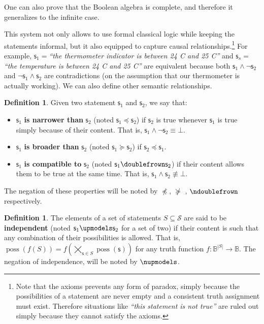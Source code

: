 \documentclass[letterpaper]{article}
\theoremstyle{plain}%
\theoremstyle{definition}
\newtheorem{defn}[thrm]{Definition}
\theoremstyle{remark}
\DeclareMathOperator{\possFn}{poss}
\def\contradiction{\bot}
\def\comp{\doublefrown}
\def\ncomp{\ndoublefrown}
\def\narrower{\preccurlyeq}
\def\nnarrower{\npreccurlyeq}
\def\broader{\succcurlyeq}
\def\nbroader{\nsucccurlyeq}
\def\indep{\upmodels}
\def\nindep{\nupmodels}
\def\AND{\wedge}
\def\NOT{\neg}
\newcommand{\stmt}[1][s] {\mathsf{#1}}
\newcommand{\statement}[1] {\emph{``#1''}}
\begin{document}
One can also prove that the Boolean algebra is complete, and therefore it generalizes to the infinite case.

This system not only allows to use formal classical logic while keeping the statements informal, but it also equipped to capture causal relationships.\footnote{Note that the axioms prevents any form of paradox, simply because the possibilities of a statement are never empty and a consistent truth assignment must exist. Therefore situations like \statement{this statement is not true} are ruled out simply because they cannot satisfy the axioms.} For example, $\stmt_1=$\statement{the thermometer indicator is between 24 C and 25 C} and $\stmt_s=$\statement{the temperature is between 24 C and 25 C} are equivalent because both $\stmt_1 \AND \NOT \stmt_2$ and $\NOT \stmt_1 \AND \stmt_2$ are contradictions (on the assumption that our thermometer is actually working). We can also define other semantic relationships.

\begin{defn}
	Given two statement $\stmt_1$ and $\stmt_2$, we say that:
	\begin{itemize}
		\item $\stmt_1$ \textbf{is narrower than} $\stmt_2$ (noted $\stmt_1 \narrower \stmt_2$) if $\stmt_2$ is true whenever $\stmt_1$ is true simply because of their content. That is, $\stmt_1 \AND \NOT \stmt_2 \equiv \contradiction$.
		\item $\stmt_1$ \textbf{is broader than} $\stmt_2$ (noted $\stmt_1 \broader \stmt_2$) if $\stmt_2 \narrower \stmt_1$.
		\item $\stmt_1$ \textbf{is compatible to} $\stmt_2$ (noted $\stmt_1 \comp \stmt_2$) if their content allows them to be true at the same time. That is, $\stmt_1 \AND \stmt_2 \nequiv \contradiction$.
		
	\end{itemize}
	The negation of these properties will be noted by $\nnarrower$, $\nbroader$ , $\ncomp$ respectively.
\end{defn}
\begin{defn}
	The elements of a set of statements $S \subseteq \mathcal{S}$ are said to be \textbf{independent} (noted $\stmt_1 \indep \stmt_2$ for a set of two) if their content is such that any combination of their possibilities is allowed. That is, $\possFn(f(S)) = f(\bigtimes\limits_{\stmt \in S} \possFn(\stmt))$ for any truth function $f : \mathbb{B}^{|S|} \to \mathbb{B}$. The negation of independence, will be noted by $\nindep$.
\end{defn}
\end{document}
